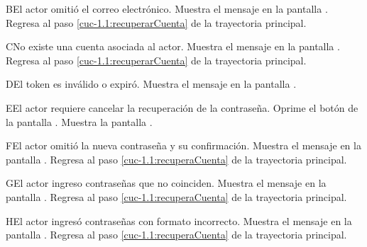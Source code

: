 \begin{UCtrayectoriaA}{B}{El actor omitió el correo electrónico.}
	\UCpaso[\UCsist] Muestra el mensaje  en la pantalla .
	\UCpaso[] Regresa al paso \ref{cuc-1.1:recuperarCuenta} de la trayectoria principal.
\end{UCtrayectoriaA}

\begin{UCtrayectoriaA}{C}{No existe una cuenta asociada al actor.}
	\UCpaso[\UCsist] Muestra el mensaje  en la pantalla .
	\UCpaso[] Regresa al paso \ref{cuc-1.1:recuperarCuenta} de la trayectoria principal.
\end{UCtrayectoriaA}

\begin{UCtrayectoriaA}{D}{El token es inválido o expiró.}
	\UCpaso[\UCsist] Muestra el mensaje  en la pantalla .
\end{UCtrayectoriaA}

\begin{UCtrayectoriaA}{E}{El actor requiere cancelar la recuperación de la contraseña.}
	\UCpaso[\UCactor] Oprime el botón  de la pantalla .
	\UCpaso[\UCsist] Muestra la pantalla .
\end{UCtrayectoriaA}

\begin{UCtrayectoriaA}{F}{El actor omitió la nueva contraseña y su confirmación.}
	\UCpaso[\UCsist] Muestra el mensaje  en la pantalla .
	\UCpaso[] Regresa al paso \ref{cuc-1.1:recuperaCuenta} de la trayectoria principal.
\end{UCtrayectoriaA}

\begin{UCtrayectoriaA}{G}{El actor ingreso contraseñas que no coinciden.}
	\UCpaso[\UCsist] Muestra el mensaje  en la pantalla .
	\UCpaso[] Regresa al paso \ref{cuc-1.1:recuperaCuenta} de la trayectoria principal.
\end{UCtrayectoriaA}

\begin{UCtrayectoriaA}{H}{El actor ingresó contraseñas con formato incorrecto.}
	\UCpaso[\UCsist] Muestra el mensaje  en la pantalla  .
	\UCpaso[] Regresa al paso \ref{cuc-1.1:recuperaCuenta} de la trayectoria principal.
\end{UCtrayectoriaA}
